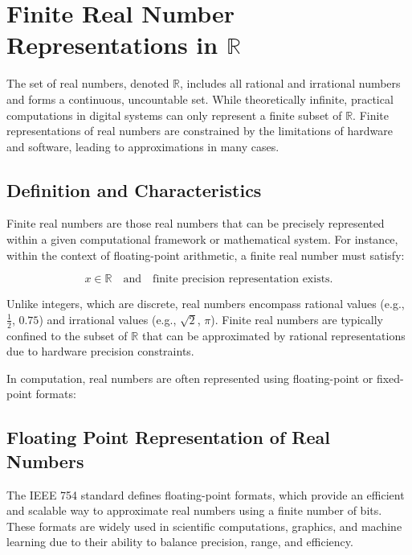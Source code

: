 \chapter{Finite Real Number Representations in $\mathbb{R}$}
\localtoc

The set of real numbers, denoted \( \mathbb{R} \), includes all rational and irrational numbers and forms a continuous, uncountable set. While theoretically infinite, practical computations in digital systems can only represent a finite subset of \( \mathbb{R} \). Finite representations of real numbers are constrained by the limitations of hardware and software, leading to approximations in many cases. 

\section{Definition and Characteristics}

Finite real numbers are those real numbers that can be precisely represented within a given computational framework or mathematical system. For instance, within the context of floating-point arithmetic, a finite real number must satisfy:

\[
x \in \mathbb{R} \quad \text{and} \quad \text{finite precision representation exists}.
\]

Unlike integers, which are discrete, real numbers encompass rational values (e.g., \( \frac{1}{2} \), \( 0.75 \)) and irrational values (e.g., \( \sqrt{2} \), \( \pi \)). Finite real numbers are typically confined to the subset of \( \mathbb{R} \) that can be approximated by rational representations due to hardware precision constraints.

In computation, real numbers are often represented using floating-point or fixed-point formats:

\section{Floating Point Representation of Real Numbers}

The IEEE 754 standard defines floating-point formats, which provide an efficient and scalable way to approximate real numbers using a finite number of bits. These formats are widely used in scientific computations, graphics, and machine learning due to their ability to balance precision, range, and efficiency.

